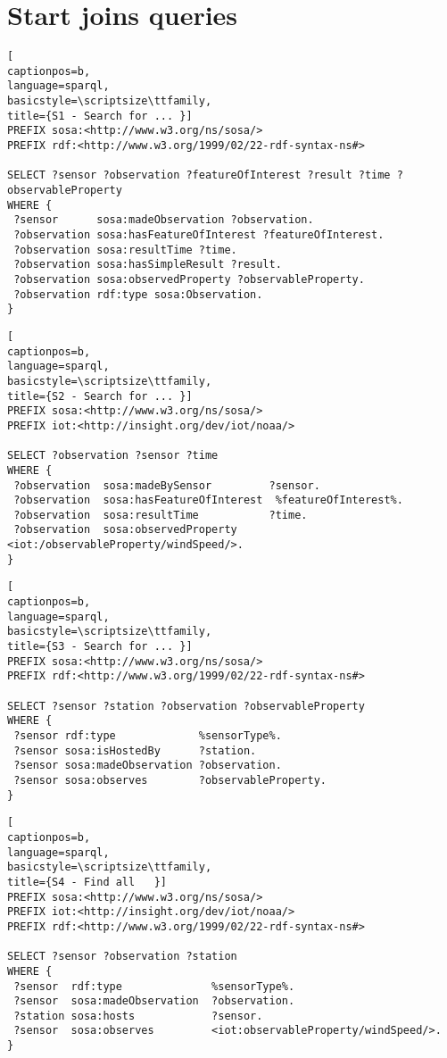 \section{Start joins queries}
\begin{lstlisting}[
captionpos=b, 
language=sparql,
basicstyle=\scriptsize\ttfamily,
title={S1 - Search for ... }]
PREFIX sosa:<http://www.w3.org/ns/sosa/>
PREFIX rdf:<http://www.w3.org/1999/02/22-rdf-syntax-ns#>

SELECT ?sensor ?observation ?featureOfInterest ?result ?time ?observableProperty
WHERE {
 ?sensor      sosa:madeObservation ?observation.
 ?observation sosa:hasFeatureOfInterest ?featureOfInterest.
 ?observation sosa:resultTime ?time.
 ?observation sosa:hasSimpleResult ?result.
 ?observation sosa:observedProperty ?observableProperty.
 ?observation rdf:type sosa:Observation.
}
\end{lstlisting}
\begin{lstlisting}[
captionpos=b, 
language=sparql,
basicstyle=\scriptsize\ttfamily,
title={S2 - Search for ... }]
PREFIX sosa:<http://www.w3.org/ns/sosa/>
PREFIX iot:<http://insight.org/dev/iot/noaa/>

SELECT ?observation ?sensor ?time 
WHERE {
 ?observation  sosa:madeBySensor         ?sensor.
 ?observation  sosa:hasFeatureOfInterest  %featureOfInterest%.
 ?observation  sosa:resultTime           ?time.
 ?observation  sosa:observedProperty      <iot:/observableProperty/windSpeed/>.
}
\end{lstlisting}
\newpage
\begin{lstlisting}[
captionpos=b, 
language=sparql,
basicstyle=\scriptsize\ttfamily,
title={S3 - Search for ... }]
PREFIX sosa:<http://www.w3.org/ns/sosa/>
PREFIX rdf:<http://www.w3.org/1999/02/22-rdf-syntax-ns#>

SELECT ?sensor ?station ?observation ?observableProperty 
WHERE {
 ?sensor rdf:type             %sensorType%.
 ?sensor sosa:isHostedBy      ?station.
 ?sensor sosa:madeObservation ?observation.
 ?sensor sosa:observes        ?observableProperty.
}
\end{lstlisting}
\begin{lstlisting}[
captionpos=b, 
language=sparql,
basicstyle=\scriptsize\ttfamily,
title={S4 - Find all   }]
PREFIX sosa:<http://www.w3.org/ns/sosa/>
PREFIX iot:<http://insight.org/dev/iot/noaa/>
PREFIX rdf:<http://www.w3.org/1999/02/22-rdf-syntax-ns#>

SELECT ?sensor ?observation ?station 
WHERE {
 ?sensor  rdf:type              %sensorType%.
 ?sensor  sosa:madeObservation  ?observation.
 ?station sosa:hosts            ?sensor.
 ?sensor  sosa:observes         <iot:observableProperty/windSpeed/>.
}
\end{lstlisting}
